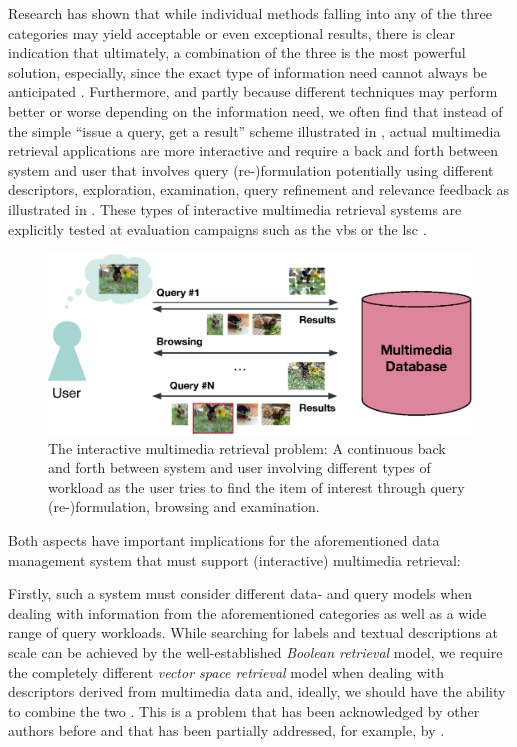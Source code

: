 Research has shown that while individual methods falling into any of the three categories may yield acceptable or even exceptional results, there is clear indication that ultimately, a combination of the three is the most powerful solution, especially, since the exact type of information need cannot always be anticipated \cite{Rossetto:2020Interactive}. Furthermore, and partly because different techniques may perform better or worse depending on the information need, we often find that instead of the simple ``issue a query, get a result'' scheme illustrated in , actual multimedia retrieval applications are more interactive and require a back and forth between system and user \cite{Lokovc:2022Task} that involves query (re-)formulation potentially using different descriptors, exploration, examination, query refinement and relevance feedback \cite{Lokovc:2019Interactive,Gurrin:2019Invited} as illustrated in . These types of interactive multimedia retrieval systems are explicitly tested at evaluation campaigns such as the \acrfull{vbs} \cite{Schoeffmann:2019Video} or the \acrfull{lsc} \cite{Gurrin:2021Introduction}.

\begin{figure}[tb]
    \centering
    \includegraphics[width=\textwidth]{figures/mr-actual.eps}
    \caption{The interactive multimedia retrieval problem: A continuous back and forth between system and user involving different types of workload as the user tries to find the item of interest through query (re-)formulation, browsing and examination.}
    \label{figure:mr-actual}
\end{figure}
 
Both aspects have important implications for the aforementioned data management system that must support (interactive) multimedia retrieval:

Firstly, such a system must consider different data- and query models when dealing with information from the aforementioned categories as well as a wide range of query workloads. While searching for labels and textual descriptions at scale can be achieved by the well-established \emph{Boolean retrieval} model, we require the completely different \emph{vector space retrieval} model when dealing with descriptors derived from multimedia data and, ideally, we should have the ability to combine the two \cite{Heller:2020Multi}. This is a problem that has been acknowledged by other authors before \cite{Jonson:2016} and that has been partially addressed, for example, by \cite{Giangreco:2018Database,Giangreco:2016Adam,Wang:2021Milvus}.

